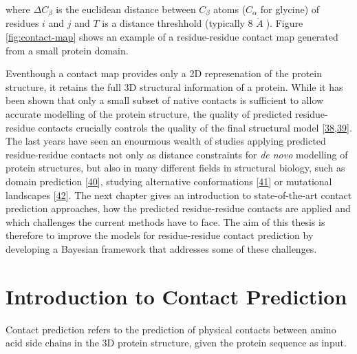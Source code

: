 \documentclass[11pt,a4paper,twoside]{book}
\newcommand{\Cb}{C_\beta}
\newcommand{\angstrom}{\mathring{A} \;}
\theoremstyle{definition}
\theoremstyle{definition}
\theoremstyle{remark}
\begin{document}
where \(\Delta \Cb\) is the euclidean distance between \(\Cb\) atoms
(\(C_\alpha\) for glycine) of residues \(i\) and \(j\) and \(T\) is a
distance threshhold (typically 8 \(\angstrom\)). Figure
\ref{fig:contact-map} shows an example of a residue-residue contact map
generated from a small protein domain.

Eventhough a contact map provides only a 2D represenation of the protein
structure, it retains the full 3D structural information of a protein.
While it has been shown that only a small subset of native contacts is
sufficient to allow accurate modelling of the protein structure, the
quality of predicted residue-residue contacts crucially controls the
quality of the final structural model
{[}\protect\hyperlink{ref-Kim2014}{38},\protect\hyperlink{ref-Duarte2010}{39}{]}.
The last years have seen an enourmous wealth of studies applying
predicted residue-residue contacts not only as distance constraints for
\emph{de novo} modelling of protein structures, but also in many
different fields in structural biology, such as domain prediction
{[}\protect\hyperlink{ref-Sadowski2013}{40}{]}, studying alternative
conformations {[}\protect\hyperlink{ref-Parisi2015a}{41}{]} or
mutational landscapes {[}\protect\hyperlink{ref-Hopf2017}{42}{]}. The
next chapter gives an introduction to state-of-the-art contact
prediction approaches, how the predicted residue-residue contacts are
applied and which challenges the current methods have to face. The aim
of this thesis is therefore to improve the models for residue-residue
contact prediction by developing a Bayesian framework that addresses
some of these challenges.

\chapter{Introduction to Contact
Prediction}\label{introduction-to-contact-prediction}

Contact prediction refers to the prediction of physical contacts between
amino acid side chains in the 3D protein structure, given the protein
sequence as input.
\end{document}
